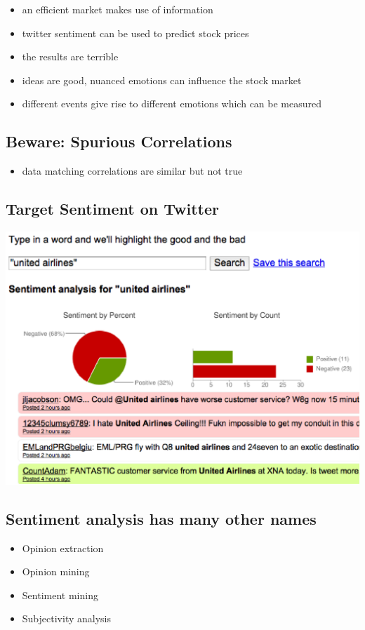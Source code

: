 \documentclass[11pt]{article}
\theoremstyle{definition}
\begin{document}
\begin{itemize}
  \item an efficient market makes use of information
  \item twitter sentiment can be used to predict stock prices
  \item the results are terrible
  \item ideas are good, nuanced emotions can influence the stock market
  \item different events give rise to different emotions which can be measured
\end{itemize}

\subsection{Beware: Spurious Correlations}
\begin{itemize}
  \item data matching correlations are similar but not true
\end{itemize}

\subsection{Target Sentiment on Twitter}
\includegraphics[width=\textwidth/2]{11.png}

\subsection{Sentiment analysis has many other names}
\begin{itemize}
  \item Opinion extraction
  \item Opinion mining
  \item Sentiment mining
  \item Subjectivity analysis
\end{itemize}
\end{document}

